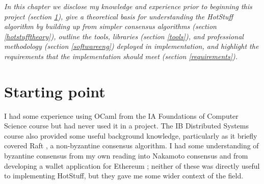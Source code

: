 



\textit{In this chapter we disclose my knowledge and experience prior to beginning this project (section \ref{start}), give a theoretical basis for understanding the HotStuff algorithm by building up from simpler consensus algorithms (section \ref{hotstufftheory}), outline the tools, libraries (section \ref{tools}), and professional methodology (section \ref{softwareeng}) deployed in implementation, and highlight the requirements that the implementation should meet (section \ref{requirements}).}

\section{Starting point} \label{start}
I had some experience using OCaml from the IA Foundations of Computer Science course but had never used it in a project. The IB Distributed Systems course also provided some useful background knowledge, particularly as it briefly covered Raft \cite{ongaroSearchUnderstandableConsensus2014}, a non-byzantine consensus algorithm. I had some understanding of byzantine consensus from my own reading into Nakamoto consensus \cite{nakamotoBitcoinPeertoPeerElectronic2008} and from developing a wallet application for Ethereum \cite{ethereumWhite, ethereumYellow}; neither of these was directly useful to implementing HotStuff, but they gave me some wider context of the field.


